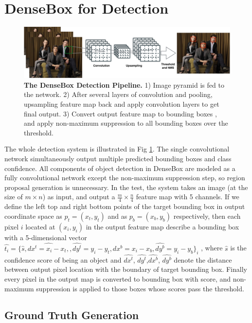  
\section{DenseBox for Detection }
\label{sec:model} 
	\begin{figure}[!hbtp]
	\centering
	 \includegraphics[scale=0.39]{figures/figure1-crop.pdf}
	\caption{\textbf{The DenseBox Detection Pipeline.} 1) Image pyramid is fed to the network. 2) After several layers of convolution and pooling, upsampling feature map back and apply convolution layers to get final output. 3) Convert output feature map to bounding boxes , and apply non-maximum suppression to all bounding boxes over the threshold. }
	\label{fig:fig_overview}
	\end{figure}


The whole detection system is illustrated in Fig \ref{fig:fig_overview}. The single convolutional network simultaneously output multiple predicted bounding boxes and class confidence. All components of object detection in DenseBox are modeled as a fully convolutional network except the non-maximum suppression step, so region proposal generation is unnecessary. In the test, the system takes an image (at the size of $m\times n$) as input, and output a $ \frac{m}{4} \times \frac{n}{4} $ feature map with 5 channels.
If we define the left top and right bottom points of the target bounding box in output coordinate space as $ p_t = (x_t, y_t)$ and as $ p_b = (x_b, y_b)$ respectively, then each pixel $i$ located at $(x_i, y_i)$ in the output feature map describe a bounding box with a 5-dimensional vector $\hat{t_i } = \{ \hat{s }, \hat{dx^{t}= x_i - x_t,},\hat{dy^{t}} = y_i - y_t,\hat{dx^{b}}= x_i - x_b,\hat{dy^{b}}= y_i - y_b \}_i$ , where $\hat{s }$ is the confidence score of being an object and $\hat{dx^{t}}$, $\hat{dy^{t}}$,$\hat{dx^{b}}$, $\hat{dy^{b}}$ denote the distance between output pixel location with the boundary of target bounding box. Finally every pixel in the output map is converted to bounding box with score, and non-maximum suppression is applied to those boxes whose scores pass the threshold. 

\subsection{Ground Truth Generation} 

